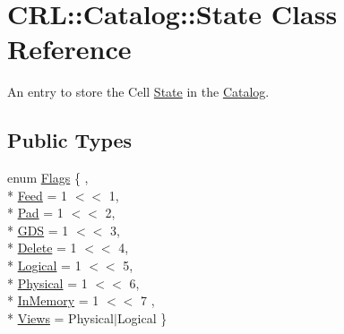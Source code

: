 \hypertarget{classCRL_1_1Catalog_1_1State}{\section{C\-R\-L\-:\-:Catalog\-:\-:State Class Reference}
\label{classCRL_1_1Catalog_1_1State}
}


An entry to store the Cell \hyperlink{classCRL_1_1Catalog_1_1State}{State} in the \hyperlink{classCRL_1_1Catalog}{Catalog}.  


\subsection*{Public Types}
\begin{DoxyCompactItemize}
\item 
enum \hyperlink{classCRL_1_1Catalog_1_1State_a625003526d38ac7500b4ad7de35e2d74}{Flags} \{ , \\*
\hyperlink{classCRL_1_1Catalog_1_1State_a625003526d38ac7500b4ad7de35e2d74a2b7599c1303429830c8d3e6b673b3cb1}{Feed} = 1 $<$$<$ 1, 
\\*
\hyperlink{classCRL_1_1Catalog_1_1State_a625003526d38ac7500b4ad7de35e2d74a2e2b8b775bb6e8d8d12500426a01e38b}{Pad} = 1 $<$$<$ 2, 
\\*
\hyperlink{classCRL_1_1Catalog_1_1State_a625003526d38ac7500b4ad7de35e2d74a98da2efe9c180f68f009836d1179cc4a}{G\-D\-S} = 1 $<$$<$ 3, 
\\*
\hyperlink{classCRL_1_1Catalog_1_1State_a625003526d38ac7500b4ad7de35e2d74ae8f1bee3750e1fa0c1d8097a28ee49da}{Delete} = 1 $<$$<$ 4, 
\\*
\hyperlink{classCRL_1_1Catalog_1_1State_a625003526d38ac7500b4ad7de35e2d74a39170df01b13e1845db6eef82cc41b33}{Logical} = 1 $<$$<$ 5, 
\\*
\hyperlink{classCRL_1_1Catalog_1_1State_a625003526d38ac7500b4ad7de35e2d74ae166fbe3aa47f42ea93b2624b2ffed7d}{Physical} = 1 $<$$<$ 6, 
\\*
\hyperlink{classCRL_1_1Catalog_1_1State_a625003526d38ac7500b4ad7de35e2d74a1f8f15ecd43109bcc463970d8acc03fd}{In\-Memory} = 1 $<$$<$ 7
, \\*
\hyperlink{classCRL_1_1Catalog_1_1State_a625003526d38ac7500b4ad7de35e2d74a6b88bbc27f9989a35a1e00772e157b35}{Views} = Physical$|$\-Logical
 \}
\end{DoxyCompactItemize}

